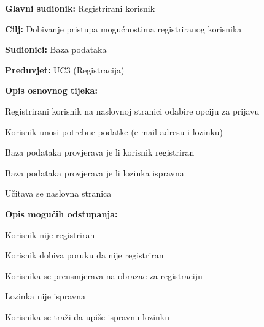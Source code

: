 					\noindent {}
					\begin{packed_item}
						
						\item \textbf{Glavni sudionik: }Registrirani korisnik
						\item \textbf{Cilj: }Dobivanje pristupa mogućnostima registriranog korisnika
						\item \textbf{Sudionici: }Baza podataka
						\item \textbf{Preduvjet: }UC3 (Registracija)
						\item \textbf{Opis osnovnog tijeka:}
						
						\item[] \begin{packed_enum}
							\item Registrirani korisnik na naslovnoj stranici odabire opciju za prijavu
							\item Korisnik unosi potrebne podatke (e-mail adresu i lozinku)
							\item Baza podataka provjerava je li korisnik registriran
							\item Baza podataka provjerava je li lozinka ispravna
							\item Učitava se naslovna stranica
						\end{packed_enum}
						\item \textbf{Opis mogućih odstupanja:}
						\item[] \begin{packed_enum}
							\item[3.a] Korisnik nije registriran
							\begin{packed_enum}
								\item[1.] Korisnik dobiva poruku da nije registriran
								\item[2.] Korisnika se preusmjerava na obrazac za registraciju
							\end{packed_enum}
							\item[4.a] Lozinka nije ispravna
							\begin{packed_enum}
								\item[1.] Korisnika se traži da upiše ispravnu lozinku
							\end{packed_enum}
						\end{packed_enum}
					\end{packed_item}
					
